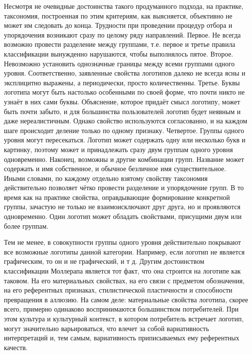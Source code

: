 Несмотря не очевидные достоинства такого продуманного подхода, на практике, таксономия, построенная
по этим критериям, как выясняется, объективно не может им следовать до конца. Трудности при
проведении процедур отбора и упорядочения возникают сразу по целому ряду направлений. Первое. Не
всегда возможно провести разделение между группами, т.е. первое и третье правила классификации
вынужденно нарушаются, чтобы выполнялось пятое. Второе. Невозможно установить однозначные границы
между всеми группами одного уровня. Соответственно, заявленные свойства логотипов далеко не всегда
ясны и эксплицитно выражены, а периодически, просто количественны. Третье. Буквы логотипа могут быть
настолько особенными по своей форме, что почти никто не узнаёт в них сами буквы. Объяснение, которое
придаёт смысл логотипу, может быть почти забыто, и для большинства пользователей логотип будет
неявным и даже нереалистичным. Однако свойство используются согласованно, и на каждом шаге
происходит деление только по одному признаку. Четвертое. Группы одного уровня могут
пересекаться. Логотип может содержать одну или несколько букв и картинку, поэтому может и
принадлежать сразу двум группам одного уровня одновременно. Наконец, возможны и другие комбинации
групп. Название может содержать и имя собственное, и обычное безличное имя существительное. Иными
словами, по каждому отдельно взятому свойству таксономия действительно позволяет чётко провести
разделение и упорядочение групп. В то время как на практике свойства, оправдывающие формирование
конкретной группы, зачастую не только не взаимоисключают друг друга, но и проявляются
одновременно. Один логотип может обладать свойствами, присущими двум или более группам.

Тем не менее, в совокупности группы одного уровня действительно покрывают все возможные логотипы
данной категории. Например, если логотип не является графическим, то он и не графический, и т
д. Другим достоинством классификации Моллерапа является тот факт, что она строится на логотипе как
таковом. На его материальных свойствах, на его связи с предметом обозначения, на его референтных
признаках, стилистической пластичности и способности превращения в аллюзию. На самом деле:
материальные свойства логотипа, скорее всего, примерно одинаково воспринимаются большинством
потребителей. При этом культура и культурный контекст, в котором потребитель встречает логотип,
могут значительно варьироваться, что влечет за собой вариативность интерпретаций и, тем самым,
вариативность приписываемых ему референтных качеств.

